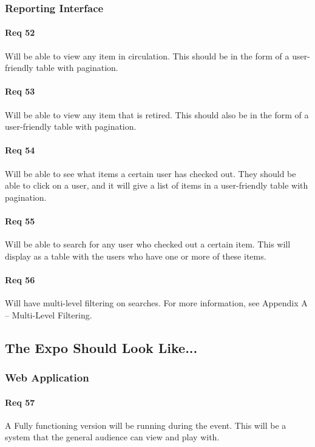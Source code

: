 \documentclass[10pt, onecolumn, twoside, peerreview]{IEEEtran}
\begin{document}
\subsubsection{Reporting Interface}
\paragraph*{Req 52} Will be able to view any item in circulation. This should be in the form of a user-friendly table with pagination.\\

\paragraph*{Req 53} Will be able to view any item that is retired. This should also be in the form of a user-friendly table with
pagination.\\

\paragraph*{Req 54} Will be able to see what items a certain user has checked out. They should be able to click on a user, and it will give
a list of items in a user-friendly table with pagination.\\

\paragraph*{Req 55} Will be able to search for any user who checked out a certain item. This will display as a table with the users who
have one or more of these items.\\

\paragraph*{Req 56} Will have multi-level filtering on searches. For more information, see Appendix A – Multi-Level Filtering.\\

\subsection{The Expo Should Look Like...}
\subsubsection{Web Application}
\paragraph*{Req 57} A Fully functioning version will be running during the event. This will be a system that the general audience can view
and play with.\\
\end{document}
